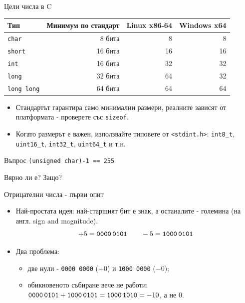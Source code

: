 \documentclass[14pt, aspectratio=169]{beamer}
\begin{document}
\begin{frame}{Цели числа в C}
  \begin{center}
    \small
    \begin{tabular}{@{}lrrr@{}}
      \toprule
      \textbf{Тип} & \textbf{Минимум по стандарт} & \textbf{Linux x86-64}
        & \textbf{Windows x64} \\
      \midrule
      \texttt{char} & 8 бита & 8 & 8 \\
      \texttt{short} & 16 бита & 16 & 16 \\
      \texttt{int} & 16 бита & 32 & 32 \\
      \texttt{long} & 32 бита & 64 & 32 \\
      \texttt{long long} & 64 бита & 64 & 64 \\
      \bottomrule
    \end{tabular}
  \end{center}
  \begin{itemize}
    \item Стандартът гарантира само минимални размери, реалните зависят от
      платформата - проверете със \texttt{sizeof}.
    \item Когато размерът е важен, използвайте типовете от
      \texttt{<stdint.h>}: \texttt{int8\_t}, \texttt{uint16\_t},
      \texttt{int32\_t}, \texttt{uint64\_t} и т.н.
  \end{itemize}
\end{frame}

\begin{frame}{Въпрос}
  \centering
  \vfill
  {\Large\texttt{(unsigned char)-1 == 255}}

  \bigskip
  Вярно ли е? Защо?
  \vfill
\end{frame}

\begin{frame}{Отрицателни числа - първи опит}
  \begin{itemize}
    \item Най-простата идея: най-старшият бит е знак, а останалите - големина
      (на англ. sign and magnitude).
      \[
        +5 = \texttt{0000\,0101} \qquad -5 = \texttt{1000\,0101}
      \]
    \item Два проблема:
      \begin{itemize}
        \item две нули - \texttt{0000\,0000} ($+0$) и \texttt{1000\,0000} ($-0$);
        \item обикновеното събиране вече не работи:
          $\texttt{0000\,0101} + \texttt{1000\,0101} = \texttt{1000\,1010} = -10$,
          а не $0$.
      \end{itemize}
  \end{itemize}
\end{frame}
\end{document}
